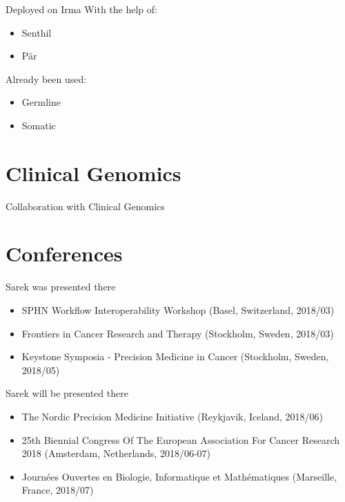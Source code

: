 \documentclass{beamer}
\begin{document}
\begin{frame}{Deployed on Irma}
	With the help of:
	\begin{itemize}
		\item Senthil
		\item Pär
	\end{itemize}
	\pause
	Already been used:
	\begin{itemize}
		\item Germline
		\item Somatic
	\end{itemize}
\end{frame}

\section{Clinical Genomics}

\begin{frame}{Collaboration with Clinical Genomics}
\end{frame}

\section{Conferences}

\begin{frame}{Sarek was presented there}
	\begin{itemize}
		\item SPHN Workflow Interoperability Workshop (Basel, Switzerland, 2018/03)
		\item Frontiers in Cancer Research and Therapy (Stockholm, Sweden, 2018/03)
		\item Keystone Symposia - Precision Medicine in Cancer (Stockholm, Sweden, 2018/05)
	\end{itemize}
\end{frame}

\begin{frame}{Sarek will be presented there}
	\begin{itemize}
		\item The Nordic Precision Medicine Initiative (Reykjavik, Iceland, 2018/06)
		\item 25th Biennial Congress Of The European Association For Cancer Research 2018 (Amsterdam, Netherlands, 2018/06-07)
		\item Journées Ouvertes en Biologie, Informatique et Mathématiques (Marseille, France, 2018/07)
	\end{itemize}
\end{frame}
\end{document}
